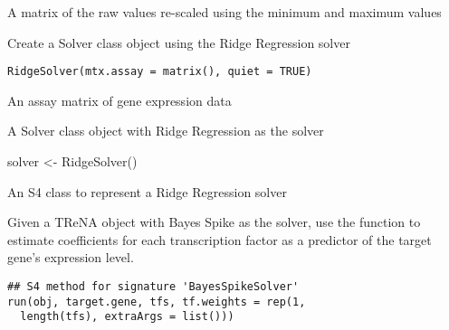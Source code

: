 \documentclass[a4paper]{book}
\begin{document}
%
\begin{Value}
A matrix of the raw values re-scaled using the minimum and maximum values
\end{Value}
%
\begin{Description}\relax
Create a Solver class object using the Ridge Regression solver
\end{Description}
%
\begin{Usage}
\begin{verbatim}
RidgeSolver(mtx.assay = matrix(), quiet = TRUE)
\end{verbatim}
\end{Usage}
%
\begin{Arguments}
\begin{ldescription}
\item[\code{mtx.assay}] An assay matrix of gene expression data
\end{ldescription}
\end{Arguments}
%
\begin{Value}
A Solver class object with Ridge Regression as the solver
\end{Value}
%
\begin{Examples}
\begin{ExampleCode}
solver <- RidgeSolver()
\end{ExampleCode}
\end{Examples}
%
\begin{Description}\relax
An S4 class to represent a Ridge Regression solver
\end{Description}
%
\begin{Description}\relax
Given a TReNA object with Bayes Spike as the solver, use the  function to estimate coefficients
for each transcription factor as a predictor of the target gene's expression level.
\end{Description}
%
\begin{Usage}
\begin{verbatim}
## S4 method for signature 'BayesSpikeSolver'
run(obj, target.gene, tfs, tf.weights = rep(1,
  length(tfs), extraArgs = list()))
\end{verbatim}
\end{Usage}
\end{document}
